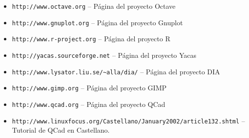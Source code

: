 \begin{itemize}
\item {\tt http://www.octave.org}  --  Página del proyecto Octave

\item {\tt http://www.gnuplot.org}  --  Página del proyecto Gnuplot

\item {\tt http://www.r-project.org} -- Página del proyecto R

\item {\tt http://yacas.sourceforge.net} -- Página del proyecto Yacas


\item {\tt http://www.lysator.liu.se/\~{}alla/dia/} --  Página del proyecto DIA

\item {\tt http://www.gimp.org} --  Página del proyecto GIMP

\item {\tt http://www.qcad.org} -- Página del proyecto QCad

\item {\tt http://www.linuxfocus.org/Castellano/January2002/article132.shtml} -- Tutorial 
de {\sf QCad} en Castellano.

\end{itemize}


